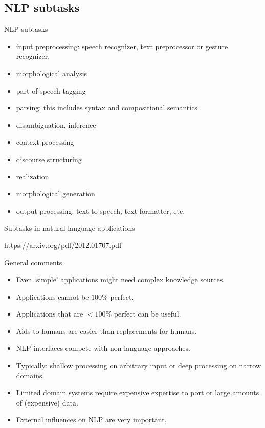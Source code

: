 \documentclass[compress]{beamer}
\begin{document}
\subsection{NLP subtasks}

\begin{frame}{NLP subtasks}
  \begin{itemize}
  \item input preprocessing: speech recognizer, text preprocessor or
    gesture recognizer.
  \item morphological analysis
  \item part of speech tagging 
  \item parsing: this includes syntax and compositional semantics
  \item disambiguation, inference 
  \item context processing 
  \item discourse structuring
  \item realization 
  \item morphological generation
  \item output processing: text-to-speech, text formatter, etc.
  \end{itemize}
\end{frame}

\begin{frame}{Subtasks in natural language applications}

  \url{https://arxiv.org/pdf/2012.01707.pdf}

\end{frame}


\begin{frame}{General comments}
  \begin{itemize}
  \item Even `simple' applications might need complex knowledge
    sources.
  \item Applications cannot be $100\%$ perfect.
  \item Applications that are $< 100\%$ perfect can be useful.
  \item Aids to humans are easier than replacements for humans.
  \item NLP interfaces compete with non-language approaches.
  \item Typically: shallow processing on arbitrary input or deep
    processing on narrow domains.
  \item Limited domain systems require expensive expertise to port or
    large amounts of (expensive) data.
  \item External influences on NLP are very important.
  \end{itemize}
\end{frame}
\end{document}

